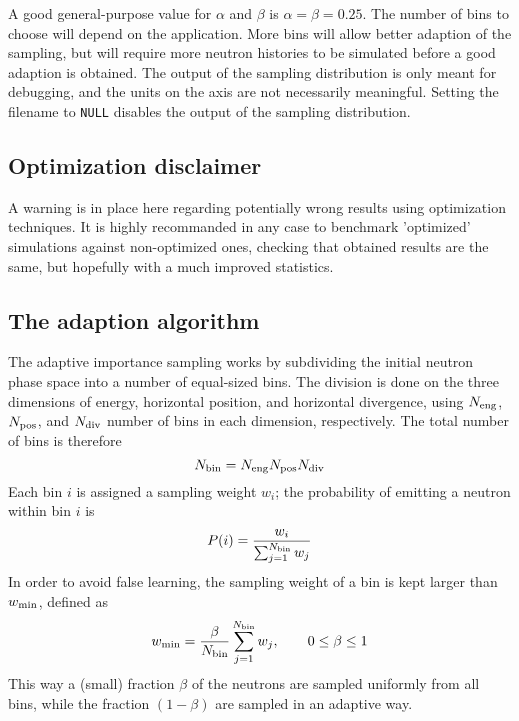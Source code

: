 A good general-purpose value for $\alpha$ and $\beta$ is $\alpha = \beta
= 0.25$. The number of bins to choose will depend on the
application. More bins will allow better adaption of the sampling, but
will require more neutron histories to be simulated before a good
adaption is obtained. The output of the sampling distribution is only
meant for debugging, and the units on the axis are not necessarily
meaningful. Setting the filename to \verb+NULL+ disables the output of
the sampling distribution.

\subsection{Optimization disclaimer}

A warning is in place here regarding potentially wrong results
using optimization techniques.
It is highly recommanded in any case to benchmark 'optimized' simulations
against non-optimized ones, checking that obtained results are the same,
but hopefully with a much improved statistics.

\subsection{The adaption algorithm}

The adaptive importance sampling works by subdividing the initial
neutron phase space into a number of equal-sized bins. The division is
done on the three dimensions of energy, horizontal position, and
horizontal divergence, using $N_{\rm eng}$, $N_{\rm pos}$, and $N_{\rm
  div}$ number of bins in each dimension, respectively. The total number
of bins is therefore
\begin{equation}
N_{\rm bin} = N_{\rm eng} N_{\rm pos} N_{\rm div}
\end{equation}
Each bin $i$ is assigned a sampling weight $w_i$; the probability of
emitting a neutron within bin $i$ is
\begin{equation}
P(i) = \frac{w_i}{\sum_{j=1}^{N_{\rm bin}} w_j}
\end{equation}
In order to avoid false learning, the sampling weight of a bin is
kept larger than $w_{\rm min}$, defined as
\begin{equation}
w_{\rm min} = \frac{\beta}{N_{\rm bin}}\sum_{j=1}^{N_{\rm bin}}w_j,\qquad
    0 \leq \beta \leq 1
\end{equation}
This way a (small) fraction $\beta$ of the neutrons are sampled
uniformly from all bins, while the fraction $(1 - \beta)$ are sampled in an adaptive way.

